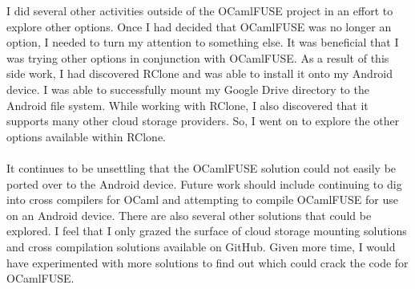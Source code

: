 I did several other activities outside of the OCamlFUSE project in an effort to explore other options. Once I had decided that OCamlFUSE was no longer an option, I needed to turn my attention to something else. It was beneficial that I was trying other options in conjunction with OCamlFUSE. As a result of this side work, I had discovered RClone and was able to install it onto my Android device. I was able to successfully mount my Google Drive directory to the Android file system. While working with RClone, I also discovered that it supports many other cloud storage providers. So, I went on to explore the other options available within RClone. \\ \\
It continues to be unsettling that the OCamlFUSE solution could not easily be ported over to the Android device. Future work should include continuing to dig into cross compilers for OCaml and attempting to compile OCamlFUSE for use on an Android device. There are also several other solutions that could be explored. I feel that I only grazed the surface of cloud storage mounting solutions and cross compilation solutions available on GitHub. Given more time, I would have experimented with more solutions to find out which could crack the code for OCamlFUSE.